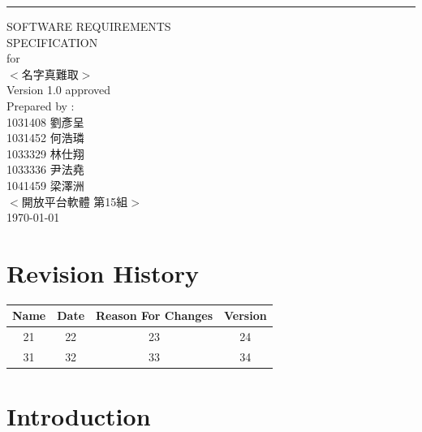 \documentclass{scrreprt}
\date{}
\def\myversion{1.0 }
\begin{document}
\begin{CJK}{UTF8}{bkai}

\begin{flushright}
    \rule{16cm}{5pt}\vskip1cm
    \begin{bfseries}
        \Huge{SOFTWARE REQUIREMENTS\\ SPECIFICATION}\\
        \vspace{1.9cm}
        for\\
        \vspace{1.0cm}
        $<$名字真難取$>$\\
        \vspace{1.0cm}
        \LARGE{Version \myversion approved}\\
        \vspace{1.0cm}
         Prepared by :  \\
	   1031408 劉彥呈\\
	   1031452 何浩璘\\
	   1033329 林仕翔\\
	   1033336 尹法堯\\
        1041459 梁澤洲\\
        \vspace{1.0cm}
        $<$開放平台軟體 第15組$>$\\
        \vspace{1.0cm}
        \today\\
    \end{bfseries}
\end{flushright}

\tableofcontents


\chapter*{Revision History}

\begin{center}
    \begin{tabular}{|c|c|c|c|}
        \hline
	    Name & Date & Reason For Changes & Version\\
        \hline
	    21 & 22 & 23 & 24\\
        \hline
	    31 & 32 & 33 & 34\\
        \hline
    \end{tabular}
\end{center}

\chapter{Introduction}


\end{CJK}
\end{document}
